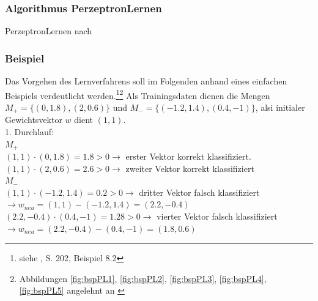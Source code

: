 \documentclass[fontsize=11pt]{scrartcl}
\begin{document}
                \subsubsection{Algorithmus PerzeptronLernen}
                    \begin{algorithm}[H]
                        \caption{PerzeptronLernen nach \cite[S.202]{ertel2016}}
                    \end{algorithm}
                
                    \subsubsection{Beispiel}
                        Das Vorgehen des Lernverfahrens soll im Folgenden anhand eines einfachen Beispiels verdeutlicht werden.\footnote{siehe \cite{ertel2016}, S. 202, Beispiel 8.2}\footnote{Abbildungen \ref{fig:bspPL1}, \ref{fig:bspPL2}, \ref{fig:bspPL3}, \ref{fig:bspPL4}, \ref{fig:bspPL5} angelehnt an \cite[S.203, Abb. 8.10]{ertel2016}}
                        \newline
                        Als Trainingsdaten dienen die Mengen $M_+ = \{(0,1.8),(2,0.6)\}$ und \newline $M_- = \{(-1.2,1.4),(0.4,-1)\}$, alsi initialer Gewichtsvektor $w$ dient $(1,1)$.\\
                        1. Durchlauf:\\
                        $M_+$\\
                        $(1,1)\cdot(0,1.8) = 1.8 > 0 \rightarrow $ erster Vektor korrekt klassifiziert.\\
                        $(1,1)\cdot(2,0.6) = 2.6 > 0 \rightarrow$ zweiter Vektor korrekt klassifiziert\\
                        $M_-$\\
                        $(1,1)\cdot(-1.2,1.4) = 0.2 > 0 \rightarrow$ dritter Vektor falsch klassifiziert\\
                        $\rightarrow w_{neu} = (1,1)-(-1.2,1.4) = (2.2,-0.4)$\\
                        $(2.2,-0.4) \cdot (0.4,-1) = 1.28 > 0 \rightarrow$ vierter Vektor falsch klassifiziert\\
                        $\rightarrow w_{neu} = (2.2,-0.4)-(0.4,-1) = (1.8,0.6)$
\end{document}

